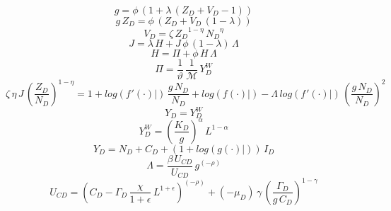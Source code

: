 \documentclass[10pt,a4paper]{article}
\begin{document}
\footnotesize
\begin{dmath}
{g}=\phi\, \left(1+\lambda\, \left({Z_D}+{V_D}-1\right)\right)
\end{dmath}
\begin{dmath}
{g}\, {Z_D}=\phi\, \left({Z_D}+{V_D}\, \left(1-\lambda\right)\right)
\end{dmath}
\begin{dmath}
{V_D}={\zeta}\, {Z_D}^{1-\eta}\, {N_D}^{\eta}
\end{dmath}
\begin{dmath}
{J}=\lambda\, {H}+{J}\, \phi\, \left(1-\lambda\right)\, {\Lambda}
\end{dmath}
\begin{dmath}
{H}={\Pi}+\phi\, {H}\, {\Lambda}
\end{dmath}
\begin{dmath}
{\Pi}=\frac{1}{\vartheta}\, \frac{1}{\mathcal{M}}\, {Y^W_D}
\end{dmath}
\begin{dmath}
{\zeta}\, \eta\, {J}\, \left(\frac{{Z_D}}{{N_D}}\right)^{1-\eta}=1+log\left({\left.       f^‎{\prime}\left( \cdot \right)   \right|}\right)\, \frac{{g}\, {N_D}}{{N_D}}+log\left({\left.       f\left( \cdot \right)            \right|}\right)-{\Lambda}\, log\left({\left.       f^‎{\prime}\left( \cdot \right)   \right|}\right)\, \left(\frac{{g}\, {N_D}}{{N_D}}\right)^{2}
\end{dmath}
\begin{dmath}
{Y_D}={Y^W_D}
\end{dmath}
\begin{dmath}
{Y^W_D}=\left(\frac{{K_D}}{{g}}\right)^{\alpha}\, {L}^{1-\alpha}
\end{dmath}
\begin{dmath}
{Y_D}={N_D}+{C_D}+\left(1+log\left({\left.       g\left( \cdot \right)            \right|}\right)\right)\, {I_D}
\end{dmath}
\begin{dmath}
{\Lambda}=\frac{\beta\, {U_{CD}}}{{U_{CD}}}\, {g}^{\left(-\rho\right)}
\end{dmath}
\begin{dmath}
{U_{CD}}=\left({C_D}-{\Gamma_D}\, \frac{\chi}{1+\epsilon}\, {L}^{1+\epsilon}\right)^{\left(-\rho\right)}+\left(-{{\mu}_{D}}\right)\, \gamma\, \left(\frac{{\Gamma_D}}{{g}\, {C_D}}\right)^{1-\gamma}
\end{dmath}
\end{document}
